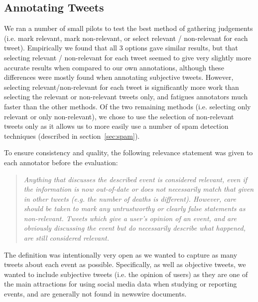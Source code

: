 \subsection{Annotating Tweets}
We ran a number of small pilots to test the best method of gathering judgements (i.e. mark relevant, mark non-relevant, or select relevant / non-relevant for each tweet).
Empirically we found that all 3 options gave similar results, but that selecting relevant / non-relevant for each tweet seemed to give very slightly more accurate results when compared to our own annotations, although these differences were mostly found when annotating subjective tweets.
However, selecting relevant/non-relevant for each tweet is significantly more work than selecting the relevant or non-relevant tweets only, and fatigues annotators much faster than the other methods.
Of the two remaining methods (i.e. selecting only relevant or only non-relevant), we chose to use the selection of non-relevant tweets only as it allows us to more easily use a number of spam detection techniques (described in section~\ref{sec:spam}).

To ensure consistency and quality, the following relevance statement was given to each annotator before the evaluation:
\begin{quote}
	\emph{
Anything that discusses the described event is considered relevant, even if the information is now out-of-date or does not necessarily match that given in other tweets (e.g. the number of deaths is different).
However, care should be taken to mark any untrustworthy or clearly false statements as non-relevant.
Tweets which give a user's opinion of an event, and are obviously discussing the event but do necessarily describe what happened, are still considered relevant.}
\end{quote}

The definition was intentionally very open as we wanted to capture as many tweets about each event as possible.
Specifically, as well as objective tweets, we wanted to include subjective tweets (i.e. the opinion of users) as they are one of the main attractions for using social media data when studying or reporting events, and are generally not found in newswire documents.

